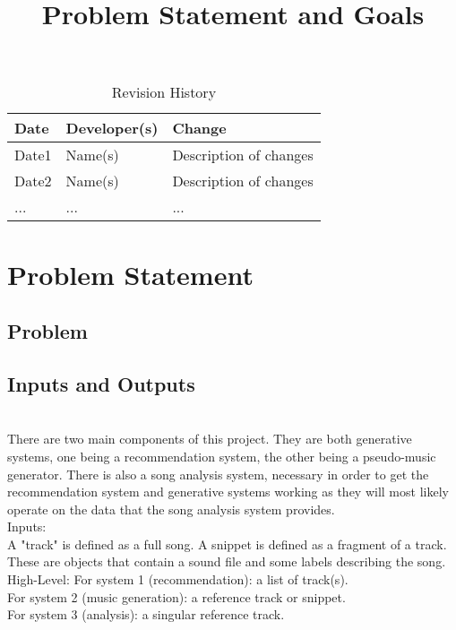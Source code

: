 \documentclass{article}
\title{Problem Statement and Goals\\\progname}
\author{\authname}
\date{}
\begin{document}
\maketitle

\begin{table}[hp]
\caption{Revision History} \label{TblRevisionHistory}
\begin{tabularx}{\textwidth}{llX}
\toprule
\textbf{Date} & \textbf{Developer(s)} & \textbf{Change}\\
\midrule
Date1 & Name(s) & Description of changes\\
Date2 & Name(s) & Description of changes\\
... & ... & ...\\
\bottomrule
\end{tabularx}
\end{table}

\section{Problem Statement}



\subsection{Problem}

\subsection{Inputs and Outputs}

\\


There are two main components of this project. They are both generative systems, one being a recommendation
system, the other being a pseudo-music generator. There is also a song analysis system, necessary in
order to get the recommendation system and generative systems working as they will most likely operate on 
the data that the song analysis system provides. \\

Inputs:\\
A "track" is defined as a full song. A snippet is defined as a fragment of a track. These are objects that 
contain a sound file and some labels describing the song. 
High-Level: 
For system 1 (recommendation): a list of track(s). \\
For system 2 (music generation): a reference track or snippet. \\
For system 3 (analysis): a singular reference track. \\
\end{document}
